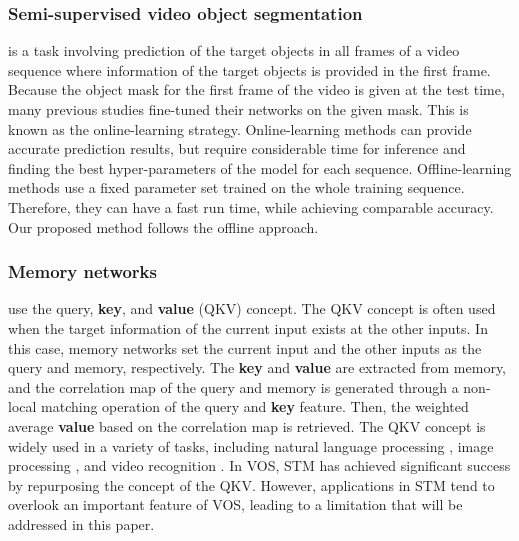 \subsubsection{Semi-supervised video object segmentation}\cite{perazzi2016benchmark,pont20172017,xu2018youtube} is a task involving prediction of the target objects in all frames of a video sequence where information of the target objects is provided in the first frame. Because the object mask for the first frame of the video is given at the test time, many previous studies \cite{shin2017pixel,cheng2017segflow,perazzi2017learning,caelles2017one,hu2017maskrnn,ci2018video,bao2018cnn,luiten2018premvos,maninis2018video,voigtlaender2017online,li2018video,Wang_2019_ICCV} fine-tuned their networks on the given mask. This is known as the online-learning strategy. Online-learning methods can provide accurate prediction results, but require considerable time for inference and finding the best hyper-parameters of the model for each sequence. Offline-learning methods \cite{marki2016bilateral,jampani2017video,yang2018efficient,chen2018blazingly,voigtlaender2019feelvos,wug2018fast,cheng2018fast,Zhang_2019_ICCV,Oh_2019_ICCV} use a fixed parameter set trained on the whole training sequence. Therefore, they can have a fast run time, while achieving comparable accuracy. Our proposed method follows the offline approach.

\subsubsection{Memory networks}\cite{sukhbaatar2015end} use the query, \textbf{key}, and \textbf{value} (QKV) concept. The QKV concept is often used when the target information of the current input exists at the other inputs. In this case, memory networks set the current input and the other inputs as the query and memory, respectively. The \textbf{key} and \textbf{value} are extracted from memory, and the correlation map of the query and memory is generated through a non-local matching operation of the query and \textbf{key} feature. Then, the weighted average \textbf{value} based on the correlation map is retrieved. The QKV concept is widely used in a variety of tasks, including natural language processing \cite{vaswani2017attention,miller2016key,kumar2016ask}, image processing \cite{parmar2018image,Zhu_2019_ICCV}, and video recognition \cite{wang2018non,girdhar2019video,seong2019video}. In VOS, STM \cite{Oh_2019_ICCV} has achieved significant success by repurposing the concept of the QKV. However, applications in STM tend to overlook an important feature of VOS, leading to a limitation that will be addressed in this paper.


